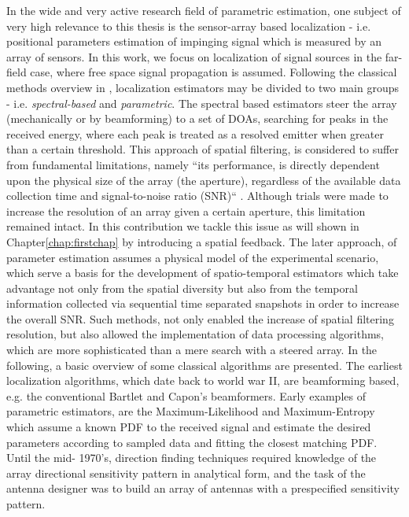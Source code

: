 In the wide and very active research field of parametric estimation, one subject of very high relevance to this thesis is the sensor-array based localization - i.e. positional parameters estimation of impinging signal which is measured by an array of sensors.
In this work, we focus on localization of signal sources in the far-field case, where free space signal propagation is assumed.
Following the classical methods overview in \cite{krim1996two}, localization estimators may be divided to two main groups - i.e. \textit{spectral-based} and \textit{parametric}.
The spectral based estimators steer the array (mechanically or by beamforming) to a set of DOAs, searching for peaks in the received energy, where each peak is treated as a resolved emitter when greater than a certain threshold.
This approach of spatial filtering, is considered to suffer from fundamental
limitations, namely ``its performance, is directly dependent upon the physical size of the array (the aperture), regardless of the available data collection time and signal-to-noise ratio (SNR)`` \cite{krim1996two}.
Although trials were made to increase the resolution of an array given a certain aperture, this limitation remained intact.
In this contribution we tackle this issue as will shown in Chapter\ref{chap:firstchap} by introducing a spatial feedback.
The later approach, of parameter estimation assumes a physical model of the experimental scenario, which serve a basis for the development of spatio-temporal estimators which take advantage not only from the spatial diversity but also from the temporal information collected via sequential time separated snapshots in order to increase the overall SNR.
Such methods, not only enabled the increase of spatial filtering resolution, but also allowed the implementation of data processing algorithms, which are more sophisticated than a mere search with a steered array.
In the following, a basic overview of some classical algorithms are presented.
The earliest localization algorithms, which date back to world war II, are beamforming based, e.g. the conventional Bartlet \cite{van2004optimum} and Capon's \cite{capon1969high} beamformers.
Early examples of parametric estimators, are the Maximum-Likelihood \cite{macdonald1969optimum,schweppe1968sensor} and Maximum-Entropy \cite{ables1974maximum} which assume a known PDF to the received signal and estimate the desired parameters according to sampled data and fitting the closest matching PDF.
Until the mid- 1970's, direction finding techniques required knowledge of the array directional sensitivity pattern in analytical form, and the task of the antenna designer was to build an array of antennas with a prespecified sensitivity pattern.
